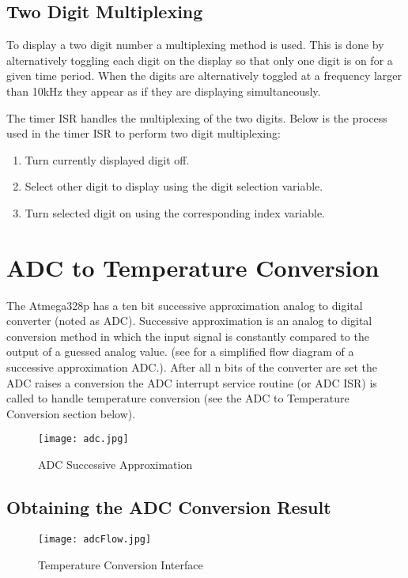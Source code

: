\documentclass[main.tex]{subfiles}
\begin{document}
		\subsection{Two Digit Multiplexing}
		To display a two digit number a multiplexing method is used. This is done by
		alternatively toggling each digit on the display so that only one digit is
		on for a given time period. When the digits are alternatively toggled at a
		frequency larger than 10kHz they appear as if they are displaying
		simultaneously. 

		The timer ISR handles the multiplexing of the two digits. Below is the
		process used in the timer ISR to perform two digit multiplexing: 

		\begin{enumerate}
			\item Turn currently displayed digit off.
			\item Select other digit to display using the digit selection variable.
			\item Turn selected digit on using the corresponding index variable.
		\end{enumerate}

	\section{ADC to Temperature Conversion}
	The Atmega328p has a ten bit successive approximation analog to digital
	converter (noted as ADC). Successive approximation is an analog to digital
	conversion method in which the input signal is constantly compared to the
	output of a guessed analog value. (see  for a simplified flow
	diagram of a successive approximation ADC.). After all n bits of the converter
	are set the ADC raises a conversion the ADC interrupt service routine (or ADC
	ISR) is called to handle temperature conversion (see the ADC to Temperature
	Conversion section below). 
	\begin{figure}[H]
		\begin{center}
			\texttt{[image: adc.jpg]}
		\end{center}
		\caption{ADC Successive Approximation}
		\label{fig:adcSA}
	\end{figure}
	
		\subsection{Obtaining the ADC Conversion Result}
		\begin{figure}[H]
			\begin{center}
				\texttt{[image: adcFlow.jpg]}
			\end{center}
			\caption{Temperature Conversion Interface}
			\label{fig:tempConvIfc}
		\end{figure}
\end{document}
